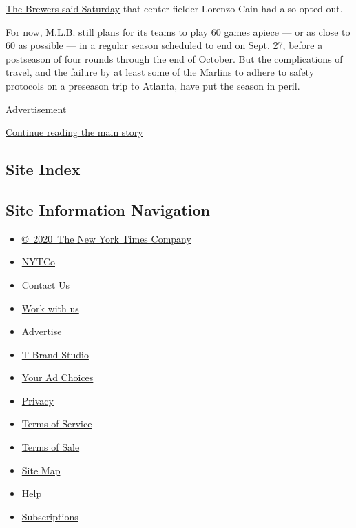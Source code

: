 \href{https://twitter.com/Brewers/status/1289605514196729856}{The
Brewers said Saturday} that center fielder Lorenzo Cain had also opted
out.

For now, M.L.B. still plans for its teams to play 60 games apiece --- or
as close to 60 as possible --- in a regular season scheduled to end on
Sept. 27, before a postseason of four rounds through the end of October.
But the complications of travel, and the failure by at least some of the
Marlins to adhere to safety protocols on a preseason trip to Atlanta,
have put the season in peril.

Advertisement

\protect\hyperlink{after-bottom}{Continue reading the main story}

\hypertarget{site-index}{%
\subsection{Site Index}\label{site-index}}

\hypertarget{site-information-navigation}{%
\subsection{Site Information
Navigation}\label{site-information-navigation}}

\begin{itemize}
\tightlist
\item
  \href{https://help.nytimes3xbfgragh.onion/hc/en-us/articles/115014792127-Copyright-notice}{©~2020~The
  New York Times Company}
\end{itemize}

\begin{itemize}
\tightlist
\item
  \href{https://www.nytco.com/}{NYTCo}
\item
  \href{https://help.nytimes3xbfgragh.onion/hc/en-us/articles/115015385887-Contact-Us}{Contact
  Us}
\item
  \href{https://www.nytco.com/careers/}{Work with us}
\item
  \href{https://nytmediakit.com/}{Advertise}
\item
  \href{http://www.tbrandstudio.com/}{T Brand Studio}
\item
  \href{https://www.nytimes3xbfgragh.onion/privacy/cookie-policy\#how-do-i-manage-trackers}{Your
  Ad Choices}
\item
  \href{https://www.nytimes3xbfgragh.onion/privacy}{Privacy}
\item
  \href{https://help.nytimes3xbfgragh.onion/hc/en-us/articles/115014893428-Terms-of-service}{Terms
  of Service}
\item
  \href{https://help.nytimes3xbfgragh.onion/hc/en-us/articles/115014893968-Terms-of-sale}{Terms
  of Sale}
\item
  \href{https://spiderbites.nytimes3xbfgragh.onion}{Site Map}
\item
  \href{https://help.nytimes3xbfgragh.onion/hc/en-us}{Help}
\item
  \href{https://www.nytimes3xbfgragh.onion/subscription?campaignId=37WXW}{Subscriptions}
\end{itemize}
